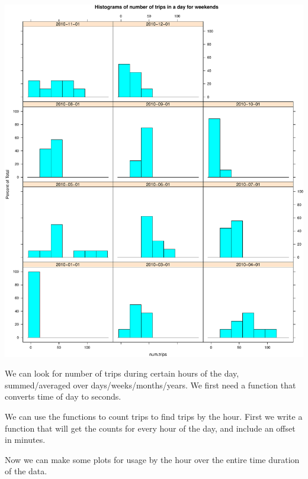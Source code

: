 \documentclass[]{article}
\begin{document}
\includegraphics{velopassBirdsEye_files/figure-latex/histtripsdistbn-3.pdf}

We can look for number of trips during certain hours of the day,
summed/averaged over days/weeks/months/years. We first need a function
that converts time of day to seconds.

We can use the functions to count trips to find trips by the hour. First
we write a function that will get the counts for every hour of the day,
and include an offset in minutes.

Now we can make some plots for usage by the hour over the entire time
duration of the data.
\end{document}
